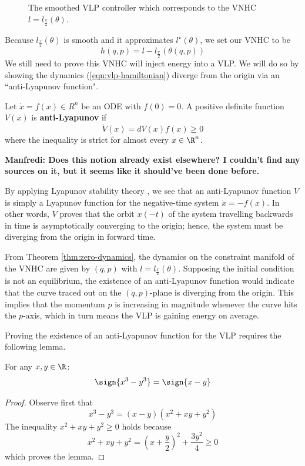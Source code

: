 \begin{figure}
   \centering
   
   \caption{The smoothed VLP controller which corresponds to the VNHC \(l =
      l_\frac{\pi}{2}(\theta)\).}\label{fig:vlp-smoothed-controller}
\end{figure}

Because \(l_\frac{\pi}{2}(\theta)\) is smooth and it approximates
\(l^\star(\theta)\), we set our VNHC to be
\[
   h(q,p) = l - l_\frac{\pi}{2}\left(\theta(q,p)\right)
\]
We still need to prove this VNHC will inject energy into a VLP. 
We will do so by showing the dynamics (\ref{eqn:vlp-hamiltonian}) 
diverge from the origin via an ``anti-Lyapunov function".

\begin{defn}\label{defn:anti-lyapunov}
   Let \(\dot{x} = f(x) \in R^n\) be an ODE with \(f(0) = 0\). 
   A positive definite function \(V(x)\) is \textbf{anti-Lyapunov} if 
   \[
      \dot{V}(x) = dV(x) f(x) \geq 0
   \]
   where the inequality is strict for almost every \(x \in \R^n\).
\end{defn}
\textbf{Manfredi: Does this notion already exist elsewhere? I couldn't find any
sources on it, but it seems like it should've been done before.}

By applying Lyapunov stability theory \cite{lyapunov},
we see that an anti-Lyapunov function
\(V\) is simply a Lyapunov function for the negative-time system 
\(\dot{x} = -f(x)\). In other words, \(V\) proves that the orbit \(x(-t)\) 
of the system travelling backwards in time is asymptotically converging to the
origin; hence, the system must be diverging from the origin in forward time.

From Theorem \ref{thm:zero-dynamics}, the dynamics on the constraint manifold of
the VNHC are given by \((\dot{q},\dot{p})\) with 
\(l = l_\frac{\pi}{2}(\theta)\).
Supposing the initial condition is not an equilibrium, the existence of an
anti-Lyapunov function would indicate that the curve traced out on the
\((q,p)\)-plane is diverging from the origin.
This implies that the momentum \(p\) is increasing in magnitude whenever the
curve hits the \(p\)-axis, which in turn means the VLP is gaining energy on
average.

Proving the existence of an anti-Lyapunov function for the VLP
requires the following lemma.

\begin{lemma}\label{lemma:sign-of-cube}
   For any \(x,y \in \R\):
   \[
      \sign{x^3 - y^3} = \sign{x-y}
   \]
\end{lemma}
\begin{proof}
   Observe first that
   \[
      x^3 - y^3 =  (x-y)(x^2 + xy + y^2)
   \]
   The inequality \(x^2 + xy + y^2 \geq 0\) holds because
   \[
      x^2 + xy + y^2 = \left(x  + \frac{y}{2}\right)^2 + \frac{3y^2}{4} \geq 0
   \]
   which proves the lemma.
\end{proof}

